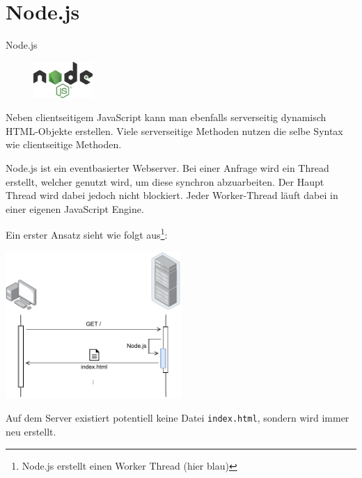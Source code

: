 \section{Node.js}

\begin{defi}{Node.js}
    \begin{figure}
        \begin{center}
            \includegraphics[width=0.2\textwidth]{includes/figures/defi_node_js.png}
        \end{center}
    \end{figure}

    Neben clientseitigem JavaScript kann man ebenfalls serverseitig dynamisch HTML-Objekte erstellen.
    Viele serverseitige Methoden nutzen die selbe Syntax wie clientseitige Methoden.

    Node.js ist ein eventbasierter Webserver.
    Bei einer Anfrage wird ein Thread erstellt, welcher genutzt wird, um diese synchron abzuarbeiten.
    Der Haupt Thread wird dabei jedoch nicht blockiert.
    Jeder Worker-Thread läuft dabei in einer eigenen JavaScript Engine.

    Ein erster Ansatz sieht wie folgt aus\footnote{Node.js erstellt einen Worker Thread (hier blau)}:
    \begin{center}
        \includegraphics[width=0.5\textwidth]{includes/figures/defi_js_server.pdf}
    \end{center}
    Auf dem Server existiert potentiell keine Datei \texttt{index.html}, sondern wird immer neu erstellt.
\end{defi}

